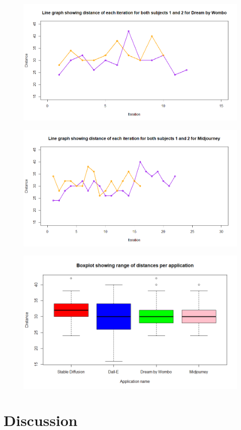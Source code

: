 \documentclass[]{report}
\begin{document}
	\begin{figure}
		\centering
		\includegraphics[width=1\linewidth]{LineGraphDBW}
		\caption{}
		\label{fig:linegraphdbw}
	\end{figure}
	
	\begin{figure}
		\centering
		\includegraphics[width=1\linewidth]{LineGraphMidJ}
		\caption{}
		\label{fig:linegraphmidj}
	\end{figure}
	
	\begin{figure}
		\centering
		\includegraphics[width=1\linewidth]{boxplotWithAllData}
		\caption{}
		\label{fig:boxplotwithalldata}
	\end{figure}
	
	\section{Discussion}
	
\end{document}

